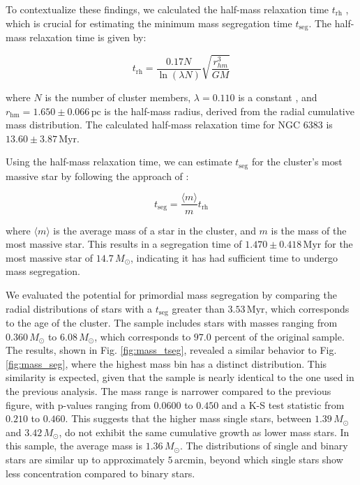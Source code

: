 \documentclass{aa}
\begin{document}
To contextualize these findings, we calculated the half-mass relaxation time $t_{\mathrm{rh}}$ \citep{1969ApJ...158L.139S}, which is crucial for estimating the minimum mass segregation time $t_{\mathrm{seg}}$. The half-mass relaxation time is given by:

\begin{equation}
t_{\mathrm{rh}} = \frac{0.17N}{\ln(\lambda N)}\sqrt{\frac{r_{hm}^3}{GM}}
\end{equation}

where $N$ is the number of cluster members, $\lambda = 0.110$ is a constant \citep{1994MNRAS.268..257G}, and $r_\mathrm{hm} = 1.650 \pm 0.066\,\mathrm{pc}$ is the half-mass radius, derived from the radial cumulative mass distribution. The calculated half-mass relaxation time for NGC 6383 is $13.60\pm 3.87\,\mathrm{Myr}$.

Using the half-mass relaxation time, we can estimate $t_{\mathrm{seg}}$ for the cluster's most massive star by following the approach of \citet{1969ApJ...158L.139S}:

\begin{equation}
t_{\mathrm{seg}} = \frac{\langle m \rangle}{m} t_{\mathrm{rh}}
\end{equation}

where $\langle m \rangle$ is the average mass of a star in the cluster, and $m$ is the mass of the most massive star. This results in a segregation time of $1.470 \pm 0.418\,\mathrm{Myr}$ for the most massive star of $14.7\,M_\odot$, indicating it has had sufficient time to undergo mass segregation.

We evaluated the potential for primordial mass segregation by comparing the radial distributions of stars with a $t_{\mathrm{seg}}$ greater than $3.53\,\mathrm{Myr}$, which corresponds to the age of the cluster. The sample includes stars with masses ranging from $0.360\,M_\odot$ to $6.08\,M_\odot$, which corresponds to $97.0$ percent of the original sample. The results, shown in Fig. \ref{fig:mass_tseg}, revealed a similar behavior to Fig. \ref{fig:mass_seg}, where the highest mass bin has a distinct distribution. This similarity is expected, given that the sample is nearly identical to the one used in the previous analysis. The mass range is narrower compared to the previous figure, with p-values ranging from $0.0600$ to $0.450$ and a K-S test statistic from $0.210$ to $0.460$. This suggests that the higher mass single stars, between $1.39\,M_\odot$ and $3.42\,M_\odot$, do not exhibit the same cumulative growth as lower mass stars. In this sample, the average mass is $1.36\,M_\odot$. The distributions of single and binary stars are similar up to approximately $5\,\mathrm{arcmin}$, beyond which single stars show less concentration compared to binary stars.
\end{document}
